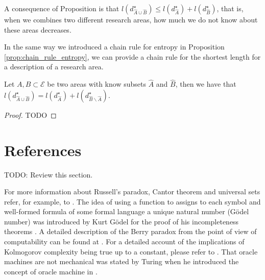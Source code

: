 A consequence of Proposition \label{prop:areas_union} is that $l \left( d_{\hat{A} \cup \hat{B}}^{\star} \right) \leq l \left( d_{\hat{A}}^{\star} \right) + l \left( d_{\hat{B}}^{\star} \right)$, that is, when we combines two different research areas, how much we do not know about these areas decreases.

In the same way we introduced a chain rule for entropy in Proposition \ref{prop:chain_rule_entropy}, we can provide a chain rule for the shortest length for a description of a research area.

\begin{proposition}
Let $A, B \subset \mathcal{E}$ be two areas with know subsets $\hat{A}$ and $\hat{B}$, then we have that $l \left( d_{\hat{A} \cup \hat{B}}^{\star} \right) = l \left( d_{\hat{A}}^{\star} \right) + l \left( d_{\hat{B} \backslash \hat{A}}^{\star} \right)$.
\end{proposition}
\begin{proof}
{\color{red} TODO}
\end{proof}

%
%

\section{References}

{\color{red} TODO: Review this section.}

For more information about Russell's paradox, Cantor theorem and universal sets refer, for example, to \cite{jech2013set}. The idea of using a function to assigns to each symbol and well-formed formula of some formal language a unique natural number (Gödel number) was introduced by Kurt Gödel for the proof of his incompleteness theorems \cite{godel1931formal}. A detailed description of the Berry paradox from the point of view of computability can be found at \cite{chaitin1995berry}. For a detailed account of the implications of Kolmogorov complexity being true up to a constant, please refer to \cite{li2013introduction}. That oracle machines are not mechanical was stated by Turing when he introduced the concept of oracle machine in \cite{turing1939systems}.

